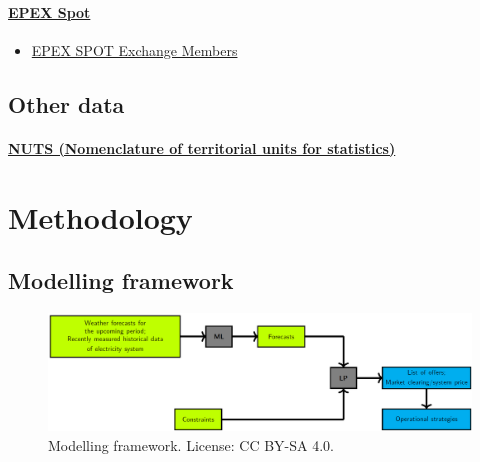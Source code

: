 \hypertarget{epex-spot}{%
\paragraph{\texorpdfstring{\href{https://www.epexspot.com/en/extras/download-center/market_data}{EPEX
Spot}}{EPEX Spot}}\label{epex-spot}}

\begin{itemize}
\tightlist
\item
  \href{https://www.epexspot.com/en/membership/list_of_members}{EPEX
  SPOT Exchange Members}
\end{itemize}

\hypertarget{other-data}{%
\subsection{Other data}\label{other-data}}

\hypertarget{nuts-nomenclature-of-territorial-units-for-statistics-1}{%
\paragraph{\texorpdfstring{\href{https://ec.europa.eu/eurostat/web/gisco/geodata/reference-data/administrative-units-statistical-units/nuts}{NUTS
(Nomenclature of territorial units for
statistics)}}{NUTS (Nomenclature of territorial units for statistics)}}\label{nuts-nomenclature-of-territorial-units-for-statistics-1}}

\hypertarget{methodology}{%
\section{Methodology}\label{methodology}}

\hypertarget{modelling-framework}{%
\subsection{Modelling framework}\label{modelling-framework}}

\begin{figure}
\centering
\includegraphics{images/model_framework.png}
\caption{Modelling framework. License: CC BY-SA 4.0.}
\end{figure}

